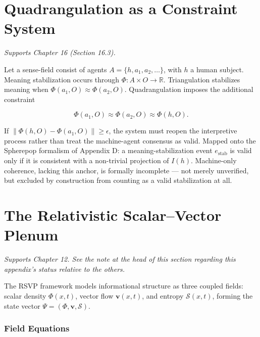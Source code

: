 \documentclass[12pt,a4paper]{book}
\begin{document}

\chapter{Quadrangulation as a Constraint System}
\label{app:quadrangulation}

\emph{Supports Chapter 16 (Section 16.3).}

Let a sense-field consist of agents $A = \{h, a_1, a_2, \ldots\}$, with $h$ a human subject. Meaning stabilization occurs through $\Phi: A \times O \to \mathbb{R}$. Triangulation stabilizes meaning when $\Phi(a_1, O) \approx \Phi(a_2, O)$. Quadrangulation imposes the additional constraint

\[
\Phi(a_1, O) \approx \Phi(a_2, O) \approx \Phi(h, O).
\]

If $\|\Phi(h,O) - \Phi(a_1,O)\| \geq \epsilon$, the system must reopen the interpretive process rather than treat the machine-agent consensus as valid. Mapped onto the Spherepop formalism of Appendix D: a meaning-stabilization event $e_{\mathrm{stab}}$ is valid only if it is consistent with a non-trivial projection of $I(h)$. Machine-only coherence, lacking this anchor, is formally incomplete — not merely unverified, but excluded by construction from counting as a valid stabilization at all.


\chapter{The Relativistic Scalar--Vector Plenum}
\label{app:rsvp}

\emph{Supports Chapter 12. See the note at the head of this section regarding this appendix's status relative to the others.}

The RSVP framework models informational structure as three coupled fields: scalar density $\Phi(x,t)$, vector flow $\mathbf{v}(x,t)$, and entropy $\mathcal{S}(x,t)$, forming the state vector $\Psi = (\Phi, \mathbf{v}, \mathcal{S})$.

\subsection*{Field Equations}
\end{document}
